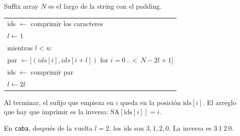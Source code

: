 \begin{frame}{Suffix array}
  \(N\) es el largo de la string con el padding.

  \medskip
  \begin{center}
  \renewcommand{\arraystretch}{1.22}
  {\ttfamily
  \begin{tabular}{@{}l@{}}
    ids \(\leftarrow\) comprimir los caracteres \\
    \(l \leftarrow 1\) \\
    mientras \(l < n\): \\
    \quad par \(\leftarrow [(ids[i], ids[i+l])\) for \(i = 0\,..\!\!<\,N-2l+1]\) \\
    \quad ids \(\leftarrow\) comprimir par \\
    \quad \(l \leftarrow 2l\)
  \end{tabular}}
  \end{center}

  \vspace{0.55em}
  Al terminar, el sufijo que empieza en \(i\) queda en la posición \(\mathrm{ids}[i]\).
  El arreglo que hay que imprimir es la inversa: \(\mathrm{SA}[\mathrm{ids}[i]] = i\).

  \medskip
  En \texttt{caba}, después de la vuelta \(l = 2\), los ids son \(3,1,2,0\).
  La inversa es \(3\ 1\ 2\ 0\).
\end{frame}
